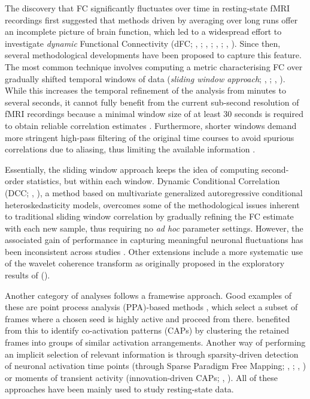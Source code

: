The discovery that FC significantly fluctuates over time in resting-state fMRI recordings \citep{Chang2010} first suggested that methods driven by averaging over long runs offer an incomplete picture of brain function, which led to a widespread effort to investigate \textit{dynamic} Functional Connectivity (dFC; \citeauthor{Hutchison2013}, \citeyear{Hutchison2013}; \citeauthor{Calhoun2014}, \citeyear{Calhoun2014}; \citeauthor{Preti2016}, \citeyear{Preti2016}; \citeauthor{Karahanoglu2017a}, \citeyear{Karahanoglu2017a}). Since then, several methodological developments have been proposed to capture this feature. The most common technique involves computing a metric characterising FC over gradually shifted temporal windows of data (\textit{sliding window approach}; \citeauthor{Leonardi2013}, \citeyear{Leonardi2013}; \citeauthor{Allen2014}, \citeyear{Allen2014}). While this increases the temporal refinement of the analysis from minutes to several seconds, it cannot fully benefit from the current sub-second resolution of fMRI recordings because a minimal window size of at least 30 seconds is required to obtain reliable correlation estimates \citep{Kucyi2014, Shen2016,Preti2016}. Furthermore, shorter windows demand more stringent high-pass filtering of the original time courses to avoid spurious correlations due to aliasing, thus limiting the available information \citep{Leonardi2015, Zalesky2015}. 


Essentially, the sliding window approach keeps the idea of computing second-order statistics, but within each window.
Dynamic Conditional Correlation (DCC;  \citeauthor{Lindquist2014}, \citeyear{Lindquist2014}), a method based on multivariate generalized autoregressive conditional heteroskedasticity models, overcomes some of the methodological issues inherent to traditional sliding window correlation by gradually refining the FC estimate with each new sample, thus requiring no \textit{ad hoc} parameter settings. However, the associated gain of performance in capturing meaningful neuronal fluctuations has been inconsistent across studies \citep{Choe2017, Damaraju2018}. Other extensions include a more systematic use of the wavelet coherence transform \citep{Rack2012,Yaesoubi2015} as originally proposed in the exploratory results of \citeauthor{Chang2010} (\citeyear{Chang2010}). 

Another category of analyses follows a framewise approach. Good examples of these are point process analysis (PPA)-based methods \citep{Tagliazucchi2012}, which select a subset of frames where a chosen seed is highly active and proceed from there. \citet{Liu2013a} benefited from this to identify co-activation patterns (CAPs) by clustering the retained frames into groups of similar activation arrangements. Another way of performing an implicit selection of relevant information is through sparsity-driven detection of neuronal activation time points (through Sparse Paradigm Free Mapping; \citeauthor{CaballeroGaudes2011}, \citeyear{CaballeroGaudes2011}; \citeauthor{Petridou2013}, \citeyear{Petridou2013}) or moments of transient activity (innovation-driven CAPs; \citeauthor{Karahanoglu2015a}, \citeyear{Karahanoglu2015a}). All of these approaches have been mainly used to study resting-state data.

